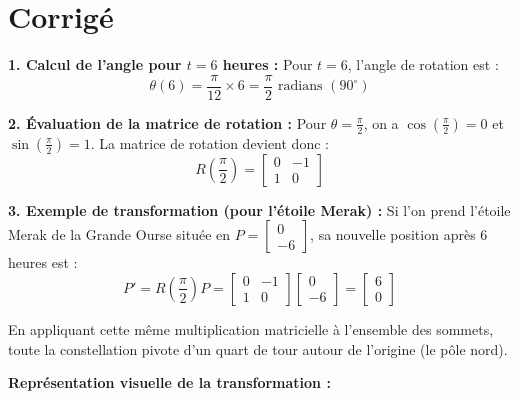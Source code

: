 \documentclass[11pt,letterpaper]{article}
\begin{document}
\newpage

\section*{Corrigé}

\textbf{1. Calcul de l'angle pour $t = 6$ heures :} Pour $t = 6$, l'angle de
rotation est :
\[
  \theta(6) = \frac{\pi}{12} \times 6
            = \frac{\pi}{2} \text{ radians } (90^\circ)
\]

\textbf{2. Évaluation de la matrice de rotation :} Pour
$\theta = \frac{\pi}{2}$, on a $\cos\left( \frac{\pi}{2} \right) = 0$ et
$\sin\left( \frac{\pi}{2} \right) = 1$. La matrice de rotation devient donc :
\[
  R\left( \frac{\pi}{2} \right) = \begin{bmatrix}
                                    0 & -1 \\
                                    1 & 0
                                  \end{bmatrix}
\]

\textbf{3. Exemple de transformation (pour l'étoile Merak) :} Si l'on prend
l'étoile Merak de la Grande Ourse située en $P = \begin{bmatrix}
                                                   0  \\
                                                   -6
                                                 \end{bmatrix}$, sa nouvelle position après 6 heures est :
\[
  P' = R\left( \frac{\pi}{2} \right) P
     = \begin{bmatrix}
         0 & -1 \\
         1 & 0
       \end{bmatrix} \begin{bmatrix}
                       0  \\
                       -6
                     \end{bmatrix}
     = \begin{bmatrix}
         6 \\
         0
       \end{bmatrix}
\]

En appliquant cette même multiplication matricielle à l'ensemble des sommets,
toute la constellation pivote d'un quart de tour autour de l'origine (le pôle
nord).

\vspace{2em}
\textbf{Représentation visuelle de la transformation :}
\end{document}
